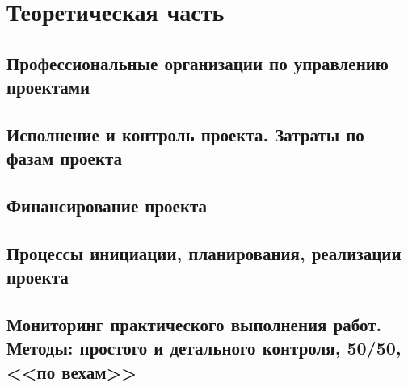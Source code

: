 \section{Теоретическая часть}
\subsection{Профессиональные организации по управлению проектами}

\subsection{Исполнение и контроль проекта. Затраты по фазам проекта}

\subsection{Финансирование проекта}

\subsection{Процессы инициации, планирования, реализации проекта}

\subsection{Мониторинг практического выполнения работ. Методы: простого и детального контроля, 50/50, <<по вехам>>}